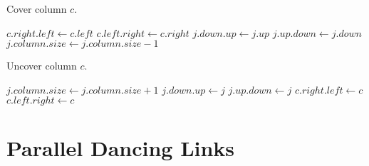 \begin{algorithm}[H]
	\caption{Cover column $c$.}
	\label{dlx_cover}
	\begin{distribalgo}[1]
			\STATE $c.right.left \leftarrow c.left$
			\STATE $c.left.right \leftarrow c.right$
					\STATE $j.down.up \leftarrow j.up$
					\STATE $j.up.down \leftarrow j.down$
					\STATE $j.column.size \leftarrow j.column.size - 1$
				\ENDFOR
			\ENDFOR
		\ENDPROC
	\end{distribalgo}
\end{algorithm}

\begin{algorithm}[H]
	\caption{Uncover column $c$.}
	\label{dlx_uncover}
	\begin{distribalgo}[1]
					\STATE $j.column.size \leftarrow j.column.size + 1$
					\STATE $j.down.up \leftarrow j$
					\STATE $j.up.down \leftarrow j$
				\ENDFOR
			\ENDFOR
			\STATE $c.right.left \leftarrow c$
			\STATE $c.left.right \leftarrow c$
		\ENDPROC
	\end{distribalgo}
\end{algorithm}


\section{Parallel Dancing Links}



\cite{Colbourn04}